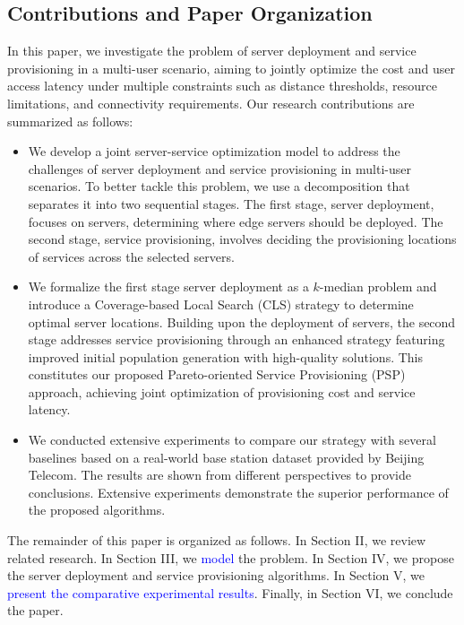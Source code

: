 \documentclass[10pt, conference, letterpaper]{IEEEtran}
\newcommand{\rev}[1]{\textcolor{blue}{#1}}
\newcommand{\rev}[1]{#1}
\begin{document}
\subsection{Contributions and Paper Organization}
In this paper, we investigate the problem of server deployment and service provisioning in a multi-user scenario, aiming to jointly optimize the cost and user access latency under multiple constraints such as distance thresholds, resource limitations, and connectivity requirements. Our research contributions are summarized as follows:
\begin{itemize}
  \item We develop a joint server-service optimization model to address the challenges of server deployment and service provisioning in multi-user scenarios. To better tackle this problem, we use a decomposition that separates it into two sequential stages. The first stage, server deployment, focuses on servers, determining where edge servers should be deployed. The second stage, service provisioning, involves deciding the provisioning locations of services across the selected servers. 
  \item We formalize the first stage server deployment as a $k$-median problem and introduce a Coverage-based Local Search (CLS) strategy to determine optimal server locations. Building upon the deployment of servers, the second stage addresses service provisioning through an enhanced strategy featuring improved initial population generation with high-quality solutions. This constitutes our proposed Pareto-oriented Service Provisioning (PSP) approach, achieving joint optimization of provisioning cost and service latency.
  \item We conducted extensive experiments to compare our strategy with several baselines based on a real-world base station dataset provided by Beijing Telecom. The results are shown from different perspectives to provide conclusions. Extensive experiments demonstrate the superior performance of the proposed algorithms.
\end{itemize}

The remainder of this paper is organized as follows. In Section II, we review related research. In Section III, we \rev{model} the problem. In Section IV, we propose the server deployment and service provisioning algorithms. In Section V, we \rev{present the comparative experimental results}. Finally, in Section VI, we conclude the paper.
\end{document}
